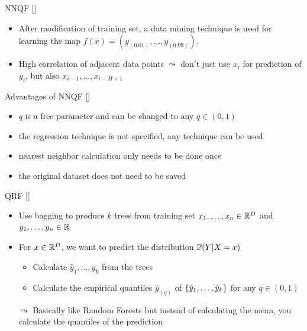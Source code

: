 \documentclass[10pt,aspectratio=169]{beamer}
\begin{document}
\begin{frame}{NNQF [\cite{Ordiano2019}]}
    \begin{itemize}
        \item After modification of training set, a data mining technique is used for learning the map \(f(x) = (y_{(0.01)}, \ldots, y_{(0.99)})\).
        \item High correlation of adjacent data points \(\leadsto\) don't just use \(x_i\) for prediction of \(y_i\), but also 
        \(x_{i-1}, \ldots, x_{i-H+1}\)
    \end{itemize}
\end{frame}

\begin{frame}{Advantages of NNQF [\cite{Ordiano2019}]}
    \begin{itemize}
        \item \(q\) is a free parameter and can be changed to any \(q\in (0,1)\)
        \item the regression technique is not specified, any technique can be used
        \item nearest neighbor calculation only needs to be done once
        \item the original dataset does not need to be saved
    \end{itemize}
\end{frame}

\begin{frame}{QRF [\cite{Meinshausen2006}]}
    \begin{itemize}
        \item Use bagging to produce \(k\) trees from training set \(x_1, \ldots, x_n \in \R^D\) and \(y_1, \ldots, y_n \in \R\)
        \item For \(x\in \R^D\), we want to predict the distribution \(\P(Y | X=x)\)
        \begin{itemize}
            \item Calculate \(\hat{y}_1, \ldots, \hat{y}_k\) from the trees 
            \item Calculate the empirical quantiles \(\hat{y}_{(q)}\) of \(\set{\hat{y}_1, \ldots, \hat{y}_k}\) for any \(q \in (0,1)\)
        \end{itemize}
        \item[\(\leadsto\)] Basically like Random Forests but instead of calculating the mean, you calculate the quantiles of the prediction
    \end{itemize}
\end{frame}
\end{document}
